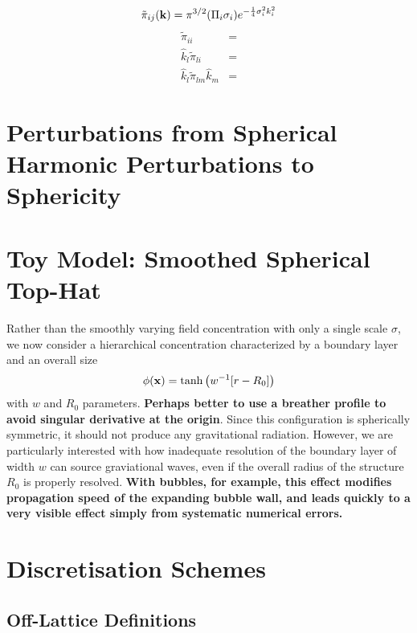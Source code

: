 \documentclass{revtex4}
\begin{document}
\begin{equation}
  \tilde{\pi}_{ij}({\bf k}) = \pi^{3/2}(\Pi_i\sigma_i)e^{-\frac{1}{4}\sigma_i^2k_i^2}
\end{equation}
\begin{subequations}
\begin{align}
  \tilde{\pi}_{ii} &= \\
  \hat{k}_l\tilde{\pi}_{li} &= \\
  \hat{k}_l\tilde{\pi}_{lm}\hat{k}_m &= 
\end{align}
\end{subequations}


\section{Perturbations from Spherical Harmonic Perturbations to Sphericity}

\section{Toy Model: Smoothed Spherical Top-Hat}
Rather than the smoothly varying field concentration with only a single scale $\sigma$, we now consider a hierarchical concentration characterized by a boundary layer and an overall size
\begin{equation}
  \phi({\bf x}) = \tanh\left(w^{-1}[r-R_0]\right)
\end{equation}
with $w$ and $R_0$ parameters.
{\bf Perhaps better to use a breather profile to avoid singular derivative at the origin}.
Since this configuration is spherically symmetric, it should not produce any gravitational radiation.
However, we are particularly interested with how inadequate resolution of the boundary layer of width $w$ can source graviational waves, even if the overall radius of the structure $R_0$ is properly resolved.
{\bf With bubbles, for example, this effect modifies propagation speed of the expanding bubble wall, and leads quickly to a very visible effect simply from systematic numerical errors.}



\section{Discretisation Schemes}
\subsection{Off-Lattice Definitions}
\end{document}
